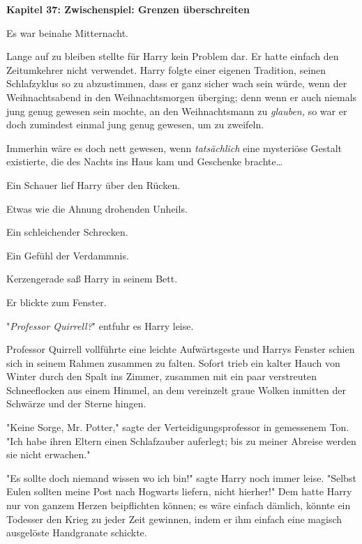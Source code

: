 

\hypertarget{zwischenspiel-grenzen-uxfcberschreiten}{%

\textbf{Kapitel 37: Zwischenspiel: Grenzen überschreiten}

Es war beinahe Mitternacht.

Lange auf zu bleiben stellte für Harry kein Problem dar. Er hatte einfach den Zeitumkehrer nicht verwendet. Harry folgte einer eigenen Tradition, seinen Schlafzyklus so zu abzustimmen, dass er ganz sicher wach sein würde, wenn der Weihnachtsabend in den Weihnachtsmorgen überging; denn wenn er auch niemals jung genug gewesen sein mochte, an den Weihnachtsmann zu \emph{glauben,} so war er doch zumindest einmal jung genug gewesen, um zu zweifeln.

Immerhin wäre es doch nett gewesen, wenn \emph{tatsächlich} eine mysteriöse Gestalt existierte, die des Nachts ins Haus kam und Geschenke brachte…

Ein Schauer lief Harry über den Rücken.

Etwas wie die Ahnung drohenden Unheils.

Ein schleichender Schrecken.

Ein Gefühl der Verdammnis.

Kerzengerade saß Harry in seinem Bett.

Er blickte zum Fenster.

"\emph{Professor Quirrell?}" entfuhr es Harry leise.

Professor Quirrell vollführte eine leichte Aufwärtsgeste und Harrys Fenster schien sich in seinem Rahmen zusammen zu falten. Sofort trieb ein kalter Hauch von Winter durch den Spalt ins Zimmer, zusammen mit ein paar verstreuten Schneeflocken aus einem Himmel, an dem vereinzelt graue Wolken inmitten der Schwärze und der Sterne hingen.

"Keine Sorge, Mr. Potter," sagte der Verteidigungsprofessor in gemessenem Ton. "Ich habe ihren Eltern einen Schlafzauber auferlegt; bis zu meiner Abreise werden sie nicht erwachen."

"Es sollte doch niemand wissen wo ich bin!" sagte Harry noch immer leise. "Selbst Eulen sollten meine Post nach Hogwarts liefern, nicht hierher!" Dem hatte Harry nur von ganzem Herzen beipflichten können; es wäre einfach dämlich, könnte ein Todesser den Krieg zu jeder Zeit gewinnen, indem er ihm einfach eine magisch ausgelöste Handgranate schickte.

}
